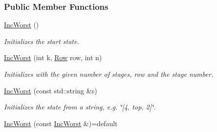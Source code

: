\subsubsection*{Public Member Functions}
\begin{DoxyCompactItemize}
\item 
\hyperlink{structdomain_1_1incWorst_1_1IncWorst_adcf1b8a3269a49b55149cc31d9b88d5d}{Inc\+Worst} ()\hypertarget{structdomain_1_1incWorst_1_1IncWorst_adcf1b8a3269a49b55149cc31d9b88d5d}{}\label{structdomain_1_1incWorst_1_1IncWorst_adcf1b8a3269a49b55149cc31d9b88d5d}

\begin{DoxyCompactList}\small\item\em Initializes the start state. \end{DoxyCompactList}\item 
\hyperlink{structdomain_1_1incWorst_1_1IncWorst_afcd98cbf1404fdf5d61d44664e024702}{Inc\+Worst} (int k, \hyperlink{structRow}{Row} row, int n)
\begin{DoxyCompactList}\small\item\em Initializes with the given number of stages, row and the stage number. \end{DoxyCompactList}\item 
\hyperlink{structdomain_1_1incWorst_1_1IncWorst_aae7fc0871a0e468ab833877b675c0805}{Inc\+Worst} (const std\+::string \&s)
\begin{DoxyCompactList}\small\item\em Initializes the state from a string, e.\+g. \char`\"{}\mbox{[}4, top, 2\mbox{]}\char`\"{}. \end{DoxyCompactList}\item 
\hyperlink{structdomain_1_1incWorst_1_1IncWorst_ac0b87249fc3ebcb5ad87dec1b5a69acf}{Inc\+Worst} (const \hyperlink{structdomain_1_1incWorst_1_1IncWorst}{Inc\+Worst} \&)=default\hypertarget{structdomain_1_1incWorst_1_1IncWorst_ac0b87249fc3ebcb5ad87dec1b5a69acf}{}\label{structdomain_1_1incWorst_1_1IncWorst_ac0b87249fc3ebcb5ad87dec1b5a69acf}


\end{DoxyCompactItemize}
